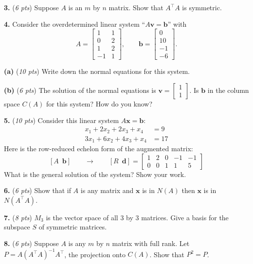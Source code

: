 \documentclass[11pt]{amsart}
\newcommand{\bb}{\mathbf{b}}
\newcommand{\bd}{\mathbf{d}}
\newcommand{\bv}{\mathbf{v}}
\newcommand{\bx}{\mathbf{x}}
\newcommand{\prob}[1]{\bigskip\noindent\textbf{#1.} }
\newcommand{\pts}[1]{(\emph{#1 pts})}
\newcommand{\probpts}[2]{\prob{#1} \pts{#2} \quad}
\newcommand{\epartpts}[2]{\medskip\noindent \textbf{(#1)} \pts{#2} \quad}
\begin{document}
\probpts{3}{6}  Suppose $A$ is an $m$ by $n$ matrix.  Show that $A^\top A$ is symmetric.
\vspace{3.0in}


\clearpage
\newpage
\prob{4}  Consider the overdetermined linear system ``$A\bv = \bb$'' with
    $$A = \begin{bmatrix} 1 & 1 \\ 0 & 2 \\ 1 & 2 \\ -1 & 1 \end{bmatrix}, \qquad \bb = \begin{bmatrix} 0 \\ 10 \\ -1 \\ -6 \end{bmatrix}.$$

\epartpts{a}{10}  Write down the normal equations for this system.
\vfill

\epartpts{b}{6}  The solution of the normal equations is $\bv = \begin{bmatrix} 1 \\ 1 \end{bmatrix}$.  Is $\bb$ in the column space $C(A)$ for this system?  How do you know?
\vspace{1.5in}


\clearpage
\newpage
\probpts{5}{10}  Consider this linear system $A\bx=\bb$:
\begin{align*}
x_1 + 2 x_2 + 2 x_3 + x_4 &= 9 \\
3 x_1 + 6 x_2 + 4 x_3 + x_4 &= 17
\end{align*}
Here is the row-reduced echelon form of the augmented matrix:
    $$[A\,\,\,\bb] \qquad \to \qquad
    [R\,\,\,\bd] = \begin{bmatrix} 1 & 2 & 0 & -1 & -1 \\ 0 & 0 & 1 & 1 & 5 \end{bmatrix}$$
What is the general solution of the system?  Show your work.
\vfill

\probpts{6}{6}  Show that if $A$ is any matrix and $\bx$ is in $N(A)$ then $\bx$ is in $N(A^\top A)$.
\vspace{2.5in}


\clearpage
\newpage
\probpts{7}{8}  $M_3$ is the vector space of all $3$ by $3$ matrices.  Give a basis for the subspace $S$ of symmetric matrices.
\vfill

\probpts{8}{6}  Suppose $A$ is any $m$ by $n$ matrix with full rank.  Let $P=A(A^\top A)^{-1} A^\top$, the projection onto $C(A)$.  Show that $P^2=P$.
\vfill
\end{document}
